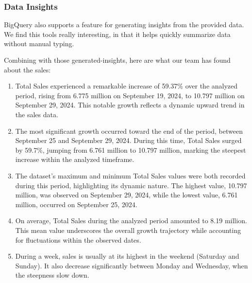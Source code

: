 \subsubsection{Data Insights}
BigQuery also supports a feature for generating insights from the provided data. We find this tools
really interesting, in that it helps quickly summarize data without manual typing.

Combining with those generated-insights, here are what our team has found about the sales:
\begin{enumerate}
    \item Total Sales experienced a remarkable increase of 59.37\% over the analyzed period, rising
    from 6.775 million on September 19, 2024, to 10.797 million on September 29, 2024. This notable
    growth reflects a dynamic upward trend in the sales data.
    \item The most significant growth occurred toward the end of the period, between September 25
    and September 29, 2024. During this time, Total Sales surged by 59.7\%, jumping from 6.761
    million to 10.797 million, marking the steepest increase within the analyzed timeframe.
    \item The dataset's maximum and minimum Total Sales values were both recorded during this
    period, highlighting its dynamic nature. The highest value, 10.797 million, was observed on
    September 29, 2024, while the lowest value, 6.761 million, occurred on September 25, 2024.
    \item On average, Total Sales during the analyzed period amounted to 8.19 million. This mean
    value underscores the overall growth trajectory while accounting for fluctuations within the
    observed dates.
    \item During a week, sales is usually at its highest in the weekend (Saturday and Sunday). It
    also decrease significantly between Monday and Wednesday, when the steepness slow down.
\end{enumerate}